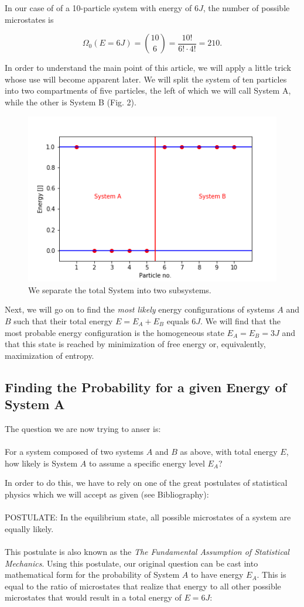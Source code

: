 In our case of of a 10-particle system with energy of $6J$, the number of possible microstates is 

$$\Omega_0(E = 6J) = {10\choose 6} = \frac{10!}{6!\cdot 4!} = 210.$$

In order to understand the main point of this article, we will apply a little trick whose use will become apparent later. We will split the system of ten particles into two compartments of five particles, the left of which we will call System A, while the other is System B (Fig. 2).

\begin{figure}
\includegraphics[scale=0.5]{images/FE_ex_2}
\caption{We separate the total System into two subsystems.}
\end{figure}

Next, we will go on to find the \textit{most likely} energy configurations of systems $A$ and $B$ such that their total energy $E = E_A + E_B$ equals $6 J$. We will find that the most probable energy configuration is the homogeneous state $E_A = E_B = 3J$ and that this state is reached by minimization of free energy or, equivalently, maximization of entropy.

\subsection{Finding the Probability for a given Energy of System A}

The question we are now trying to anser is:
\\
\\
For a system composed of two systems $A$ and $B$ as above, with total energy $E$, how likely is System $A$ to assume a specific energy level $E_A$?

In order to do this, we have to rely on one of the great postulates of statistical physics which we will accept as given (see Bibliography):
\\
\\
POSTULATE: In the equilibrium state, all possible microstates of a system are equally likely.
\\
\\
This postulate is also known as the \textit{The Fundamental Assumption of Statistical Mechanics}.
Using this postulate, our original question can be cast into mathematical form for the probability of System $A$ to have energy $E_A$. This is equal to the ratio of microstates that realize that energy to all other possible microstates that would result in a total energy of $E = 6J$:

